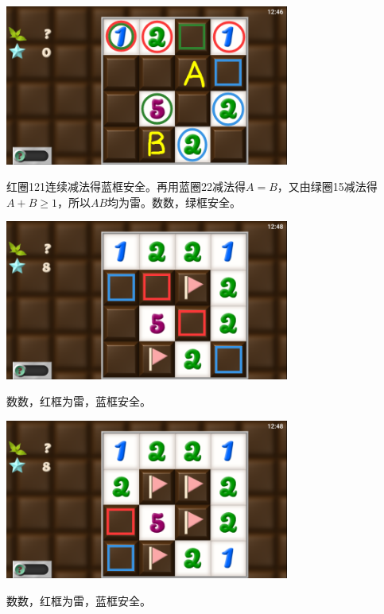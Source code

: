 \subsection{} %
\begin{center}
    \includegraphics[width=0.7\textwidth]{puzzle/88-1.png}
\end{center}
红圈121连续减法得蓝框安全。再用蓝圈22减法得$A=B$，又由绿圈15减法得$A+B\ge 1$，所以$AB$均为雷。数数，绿框安全。
\begin{center}
    \includegraphics[width=0.7\textwidth]{puzzle/88-2.png}
\end{center}
数数，红框为雷，蓝框安全。
\begin{center}
    \includegraphics[width=0.7\textwidth]{puzzle/88-3.png}
\end{center}
数数，红框为雷，蓝框安全。

